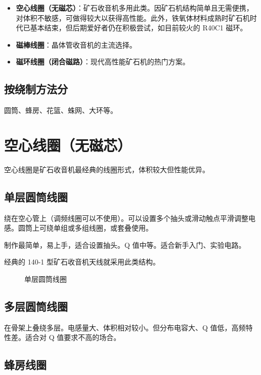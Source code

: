 \documentclass[12pt,UTF8]{ctexbook}
\begin{document}
\begin{itemize}[leftmargin=2cm]
	\item \textbf{空心线圈（无磁芯）}：矿石收音机多用此类。因矿石机结构简单且无需便携，对体积不敏感，可做得较大以获得高性能。此外，铁氧体材料成熟时矿石机时代已基本结束，但后期爱好者仍在积极尝试，如目前较火的 R40C1 磁环。
	\item \textbf{磁棒线圈}：晶体管收音机的主流选择。
	\item \textbf{磁环线圈（闭合磁路）}：现代高性能矿石机的热门方案。
\end{itemize}

\subsection{按绕制方法分}

圆筒、蜂房、花篮、蛛网、大环等。


\section{空心线圈（无磁芯）}

空心线圈是矿石收音机最经典的线圈形式，体积较大但性能优异。

\subsection{单层圆筒线圈}

绕在空心管上（调频线圈可以不使用）。可以设置多个抽头或滑动触点平滑调整电感。圆筒上可绕单组或多组线圈，或套叠使用。

制作最简单，易上手，适合设置抽头。Q 值中等。适合新手入门、实验电路。

经典的 140-1 型矿石收音机天线就采用此类结构。

\begin{figure}[H]
	\centering
	\caption{单层圆筒线圈}
	\label{fig:single-layer-coil}
\end{figure}

\subsection{多层圆筒线圈}

在骨架上叠绕多层。电感量大、体积相对较小。但分布电容大、Q 值低，高频特性差。适合对 Q 值要求不高的场合。

\subsection{蜂房线圈}
\end{document}
